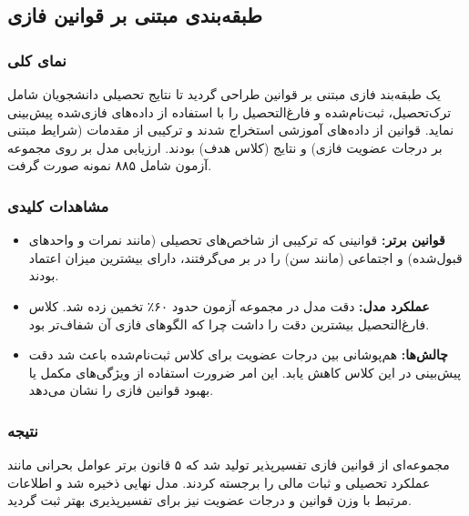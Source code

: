 
\subsection{طبقه‌بندی مبتنی بر قوانین فازی}

\subsubsection{نمای کلی}

یک طبقه‌بند فازی مبتنی بر قوانین طراحی گردید تا نتایج تحصیلی دانشجویان شامل ترک‌تحصیل، ثبت‌نام‌شده و فارغ‌التحصیل را با استفاده از داده‌های فازی‌شده پیش‌بینی نماید. قوانین از داده‌های آموزشی استخراج شدند و ترکیبی از مقدمات (شرایط مبتنی بر درجات عضویت فازی) و نتایج (کلاس هدف) بودند. ارزیابی مدل بر روی مجموعه آزمون شامل ۸۸۵ نمونه صورت گرفت.

\subsubsection{مشاهدات کلیدی}

\begin{itemize}

	
	\item \textbf{قوانین برتر:} قوانینی که ترکیبی از شاخص‌های تحصیلی (مانند نمرات و واحدهای قبول‌شده) و اجتماعی (مانند  سن) را در بر می‌گرفتند، دارای بیشترین میزان اعتماد بودند.
	
	\item \textbf{عملکرد مدل:} دقت  مدل در مجموعه آزمون حدود  ۶۰٪ تخمین زده شد. کلاس فارغ‌التحصیل بیشترین دقت را داشت چرا که الگوهای فازی آن شفاف‌تر بود.
	
	\item \textbf{چالش‌ها:} هم‌پوشانی بین درجات عضویت برای کلاس ثبت‌نام‌شده باعث شد دقت پیش‌بینی در این کلاس کاهش یابد. این امر ضرورت استفاده از ویژگی‌های مکمل یا بهبود قوانین فازی را نشان می‌دهد.
\end{itemize}

\subsubsection{نتیجه}

مجموعه‌ای از قوانین فازی تفسیرپذیر تولید شد که ۵ قانون برتر عوامل بحرانی مانند عملکرد تحصیلی و ثبات مالی را برجسته کردند. مدل نهایی ذخیره شد و اطلاعات مرتبط با وزن قوانین و درجات عضویت نیز برای تفسیرپذیری بهتر ثبت گردید.


